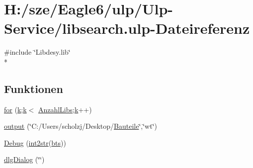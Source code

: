 \hypertarget{libsearch_8ulp}{}\section{H\+:/sze/\+Eagle6/ulp/\+Ulp-\/\+Service/libsearch.ulp-\/\+Dateireferenz}
\label{libsearch_8ulp}
{\ttfamily \#include \char`\"{}Libdesy.\+lib\char`\"{}}\\*
\subsection*{Funktionen}
\begin{DoxyCompactItemize}
\item 
\hyperlink{libsearch_8ulp_a7ff0a764a1a161522eb0e1c3b7981d20}{for} (\hyperlink{test_8ulp_ab66ed8e0098c0a86b458672a55a9cca9}{k};\hyperlink{test_8ulp_ab66ed8e0098c0a86b458672a55a9cca9}{k}$<$ \hyperlink{test_8ulp_ae8b208e90c3b4ab20d7c823612b1a0f7}{Anzahl\+Libs};\hyperlink{test_8ulp_ab66ed8e0098c0a86b458672a55a9cca9}{k}++)
\item 
\hyperlink{libsearch_8ulp_adfddfed855c5135b2c174454e4e1a81c}{output} (\char`\"{}C\+:/Users/scholzj/Desktop/\hyperlink{suche_8ulp_a093b50ecdc1cc55a1997cfbb25356737}{Bauteile}\char`\"{},\char`\"{}wt\char`\"{})
\item 
\hyperlink{libsearch_8ulp_add2034f331d6204743e4830896b66de6}{Debug} (\hyperlink{uebersicht_8ulp_aabffd2ab08d259550d4750cfa9c249dc}{int2str}(\hyperlink{test_8ulp_a00c6cb851706bdde7570b25efe80733a}{bts}))
\item 
\hyperlink{libsearch_8ulp_abc5e2c5bfe828c9bd28ed667f19cf117}{dlg\+Dialog} (\char`\"{}\char`\"{})
\end{DoxyCompactItemize}
